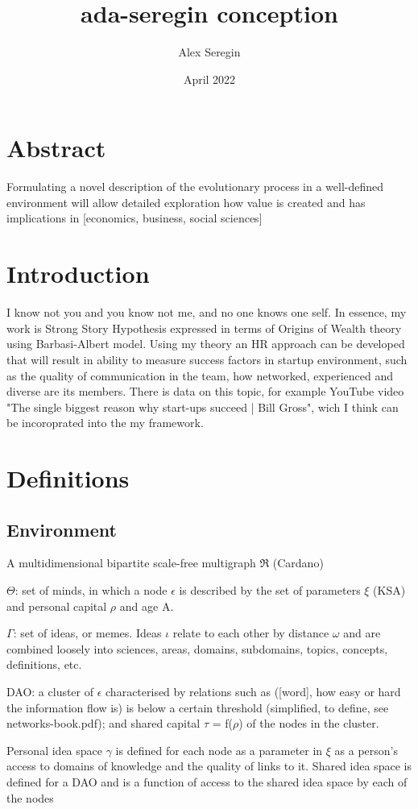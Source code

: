 \documentclass{article}
\title{ada-seregin conception}
\author{Alex Seregin}
\date{April 2022}
\begin{document}
\maketitle
\section{Abstract}
Formulating a novel description of the evolutionary process in a well-defined environment will allow detailed exploration how value is created and has implications in [economics, business, social sciences]
\section{Introduction}
I know not you and you know not me, and no one knows one self.
In essence, my work is Strong Story Hypothesis expressed in terms of Origins of Wealth theory using Barbasi-Albert model.
Using my theory an HR approach can be developed that will result in ability to measure success factors in startup environment, such as the quality of communication in the team, how networked, experienced and diverse are its members. There is data on this topic, for example YouTube video "The single biggest reason why start-ups succeed | Bill Gross", wich I think can be incoroprated into the my framework.
\section{Definitions}
\subsection{Environment}
A multidimensional bipartite scale-free multigraph $\Re$ (Cardano)

$\Theta$: set of minds, in which a node $\epsilon$ is described by the set of parameters $\xi$ (KSA) and personal capital $\rho$ and age A.

$\Gamma$: set of ideas, or memes. Ideas $\iota$ relate to each other by distance $\omega$ and are combined loosely into sciences, areas, domains, subdomains, topics, concepts, definitions, etc.

DAO: a cluster of $\epsilon$ characterised by relations such as ([word], how easy or hard the information flow is) is below a certain threshold (simplified, to define, see networks-book.pdf); and shared capital $\tau$ = f($\rho$) of the nodes in the cluster.

Personal idea space $\gamma$ is defined for each node as a parameter in $\xi$ as a person's access to domains of knowledge and the quality of links to it. 
Shared idea space is defined for a DAO and is a function of access to the shared idea space by each of the nodes
\end{document}
